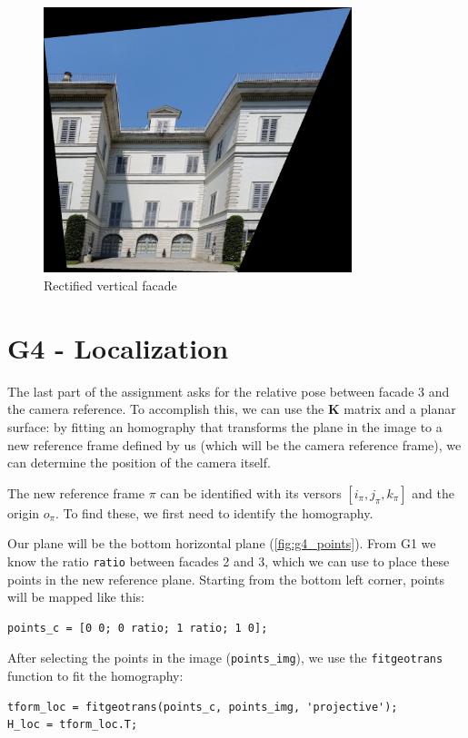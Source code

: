 \documentclass{Configuration_Files/PoliMi3i_thesis}
\begin{document}
\begin{figure}[H]
    \centering
    \includegraphics[width=0.8\textwidth]{output/G3_final.png}
    \caption{Rectified vertical facade}
    \label{fig:g3_rectified}
\end{figure}

\chapter{G4 - Localization}

The last part of the assignment asks for the relative pose between facade 3 and the camera reference.
To accomplish this, we can use the $\mathbf{K}$ matrix and a planar surface: by fitting an homography that transforms the plane in the image to a new reference frame defined by us (which will be the camera reference frame), we can determine the position of the camera itself.

The new reference frame $\pi$ can be identified with its versors $[i_\pi, j_\pi, k_\pi]$ and the origin $o_\pi$. To find these, we first need to identify the homography.

Our plane will be the bottom horizontal plane (\ref{fig:g4_points}). From G1 we know the ratio \verb|ratio| between facades 2 and 3, which we can use to place these points in the new reference plane. Starting from the bottom left corner, points will be mapped like this:
\begin{verbatim}
points_c = [0 0; 0 ratio; 1 ratio; 1 0];	
\end{verbatim}

After selecting the points in the image (\verb|points_img|), we use the \verb|fitgeotrans| function to fit the homography:
\begin{verbatim}
tform_loc = fitgeotrans(points_c, points_img, 'projective');
H_loc = tform_loc.T;
\end{verbatim}
\end{document}
